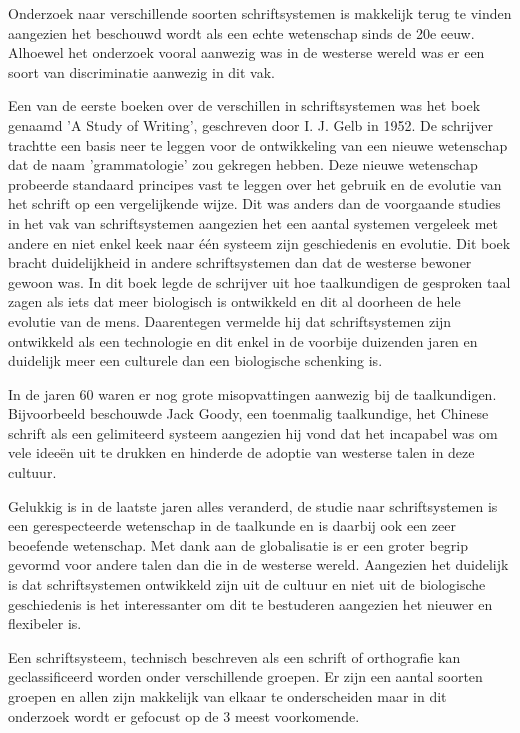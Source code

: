 Onderzoek naar verschillende soorten schriftsystemen is makkelijk terug te vinden aangezien het beschouwd wordt als een echte wetenschap sinds de 20e eeuw.
Alhoewel het onderzoek vooral aanwezig was in de westerse wereld was er een soort van discriminatie aanwezig in dit vak.

Een van de eerste boeken over de verschillen in schriftsystemen was het boek genaamd 'A Study of Writing', geschreven door I. J. Gelb in 1952. \autocite{Gelb1952}
De schrijver trachtte een basis neer te leggen voor de ontwikkeling van een nieuwe wetenschap dat de naam 'grammatologie' zou gekregen hebben.
Deze nieuwe wetenschap probeerde standaard principes vast te leggen over het gebruik en de evolutie van het schrift op een vergelijkende wijze.
Dit was anders dan de voorgaande studies in het vak van schriftsystemen aangezien het een aantal systemen vergeleek met andere en niet enkel keek naar één systeem zijn geschiedenis en evolutie.
Dit boek bracht duidelijkheid in andere schriftsystemen dan dat de westerse bewoner gewoon was. 
In dit boek legde de schrijver uit hoe taalkundigen de gesproken taal zagen als iets dat meer biologisch is ontwikkeld en dit al doorheen de hele evolutie van de mens.
Daarentegen vermelde hij dat schriftsystemen zijn ontwikkeld als een technologie en dit enkel in de voorbije duizenden jaren en duidelijk meer een culturele dan een biologische schenking is.

In de jaren 60 waren er nog grote misopvattingen aanwezig bij de taalkundigen.
Bijvoorbeeld beschouwde Jack Goody, een toenmalig taalkundige,  het Chinese schrift als een gelimiteerd systeem aangezien hij vond dat het incapabel was om vele ideeën uit te drukken en hinderde de adoptie van westerse talen in deze cultuur.

Gelukkig is in de laatste jaren alles veranderd, de studie naar schriftsystemen is een gerespecteerde wetenschap in de taalkunde en is daarbij ook een zeer beoefende wetenschap. 
Met dank aan de globalisatie is er een groter begrip gevormd voor andere talen dan die in de westerse wereld.
Aangezien het duidelijk is dat schriftsystemen ontwikkeld zijn uit de cultuur en niet uit de biologische geschiedenis is het interessanter om dit te bestuderen aangezien het nieuwer en flexibeler is.

Een schriftsysteem, technisch beschreven als een schrift of orthografie kan geclassificeerd worden onder verschillende groepen.
Er zijn een aantal soorten groepen en allen zijn makkelijk van elkaar te onderscheiden maar in dit onderzoek wordt er gefocust op de 3 meest voorkomende.

